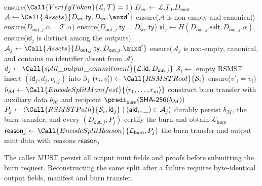 \begin{algorithm}[!htbp]
	\caption{Split Construction}\label{alg:split-construction}
	\begin{algorithmic}[0]
			\State ensure($\Call{VerifyToken}{\mathcal{L},\mathcal{T}}=1$)
			\State $D_\mathsf{src}\gets\mathcal{L}.T_0.D_\mathsf{mint}$
			\State $\mathcal{A}\gets\Call{Assets}{D_\mathsf{src}.\mathsf{ty},D_\mathsf{src}.\auxd'}$
			\State ensure($\mathcal{A}$ is non-empty and canonical)
				\State ensure($D_{\mathsf{out},j}.\alpha=\mathcal{T}.\alpha$)
				\State ensure($D_{\mathsf{out},j}.\mathsf{ty}=D_\mathsf{src}.\mathsf{ty}$)
				\State $\mathsf{id}_j\gets H(D_{\mathsf{out},j}.\mathsf{salt},D_{\mathsf{out},j}.\alpha)$
				\State ensure($\mathsf{id}_j$ is distinct among the outputs)
				\State $\mathcal{A}_j\gets\Call{Assets}{D_{\mathsf{out},j}.\mathsf{ty},D_{\mathsf{out},j}.\auxd'}$
				\State ensure($\mathcal{A}_j$ is non-empty, canonical, and contains no identifier absent from $\mathcal{A}$)
				\State $d_j\gets\Call{split\_output\_commitment}{\mathcal{L}.\mathsf{id},D_{\mathsf{out},j}}$
			\EndFor
				\State $\mathcal{S}_i\gets$ empty RSMST
						\State insert $(\mathsf{id}_j,d_j,v_{i,j})$ into $\mathcal{S}_i$
					\EndIf
				\EndFor
				\State $(r_i,v'_i)\gets\Call{RSMSTRoot}{\mathcal{S}_i}$
				\State ensure($v'_i=v_i$)
			\EndFor
			\State $b_\mathcal{M}\gets\Call{EncodeSplitManifest}{\langle r_1,\ldots,r_m\rangle}$
			\State construct burn transfer with auxiliary data $b_\mathcal{M}$ and recipient $\predi_\mathsf{burn}(\mathsf{SHA\text{-}256}(b_\mathcal{M}))$
				\State $P_j\gets\langle\Call{RSMSTPath}{\mathcal{S}_i,\mathsf{id}_j}\mid(\mathsf{aid}_i,\_)\in\mathcal{A}_j\rangle$
			\EndFor
			\State durably persist $b_\mathcal{M}$, the burn transfer, and every $(D_{\mathsf{out},j},P_j)$
			\State certify the burn and obtain $\mathcal{L}_\mathsf{burn}$
				\State $\mathsf{reason}_j\gets\Call{EncodeSplitReason}{\mathcal{L}_\mathsf{burn},P_j}$
			\EndFor
			\State \Return the burn transfer and output mint data with reasons $\mathsf{reason}_j$
		\EndFunction
	\end{algorithmic}
\end{algorithm}

The caller MUST persist all output mint fields and proofs before submitting the burn request. Reconstructing the same split after a failure requires byte-identical output fields, manifest and burn transfer.

